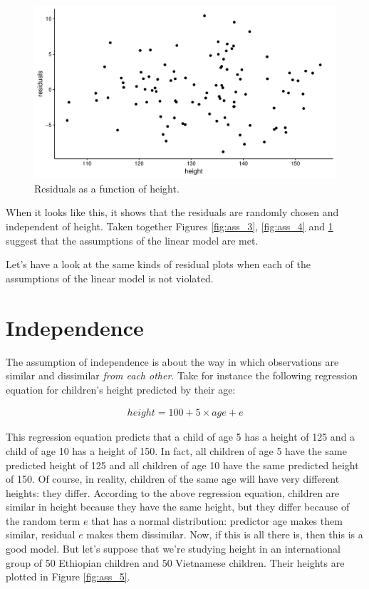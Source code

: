 \documentclass[]{book}\usepackage[]{graphicx}\usepackage[]{color}
\makeatletter
\def\maxwidth{ %
  \ifdim\Gin@nat@width>\linewidth
    \linewidth
  \else
    \Gin@nat@width
  \fi
}
\newenvironment{knitrout}{}{} %
\makeatother
\begin{document}
\begin{knitrout}
\color{fgcolor}\begin{figure}

{\centering \includegraphics[width=\maxwidth]{figure/ass_4b-1} 

}

\caption[Residuals as a function of height]{Residuals as a function of height.}\label{fig:ass_4b}
\end{figure}


\end{knitrout}


When it looks like this, it shows that the residuals are randomly chosen and independent of height. Taken together Figures \ref{fig:ass_3}, \ref{fig:ass_4} and \ref{fig:ass_4b} suggest that the assumptions of the linear model are met. 

Let's have a look at the same kinds of residual plots when each of the assumptions of the linear model is not violated.

\section{Independence}
The assumption of independence is about the way in which observations are similar and dissimilar \textit{from each other}. Take for instance the following regression equation for children's height predicted by their age:

\begin{eqnarray}
height = 100 + 5 \times age + e
\end{eqnarray}

This regression equation predicts that a child of age 5 has a height of 125 and a child of age 10 has a height of 150. In fact, all children of age 5 have the same predicted height of 125 and all children of age 10 have the same predicted height of 150. Of course, in reality, children of the same age will have very different heights: they differ. According to the above regression equation, children are similar in height because they have the same height, but they differ because of the random term $e$ that has a normal distribution: predictor age makes them similar, residual $e$ makes them dissimilar. Now, if this is all there is, then this is a good model. But let's suppose that we're studying height in an international group of 50 Ethiopian children and 50 Vietnamese children. Their heights are plotted in Figure \ref{fig:ass_5}.
\end{document}

